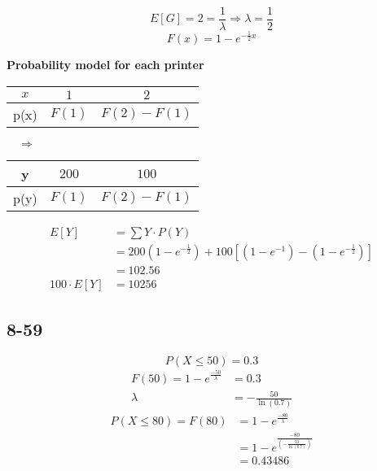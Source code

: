 \documentclass{article}
\begin{document}
			\[
				E[G] = 2 = \frac{1}{\lambda} \Rightarrow \lambda = \frac{1}{2}
			\]
			\[
				F(x) = 1 - e^{-\frac{1}{2} x}
			\]
			\begin{center}
				\textbf{Probability model for each printer} \\
				\vspace{5mm}
				\begin{tabular}{c|c|c}
					$x$ & $1$ & $2$ \\
					\hline
					p(x) & $F(1)$ & $F(2)-F(1)$ \\
				\end{tabular}
				$\quad \Rightarrow \quad$
				\begin{tabular}{c|c|c}
					y & $200$ & $100$ \\
					\hline
					p(y) & $F(1)$ & $F(2)-F(1)$ \\
				\end{tabular}
			\end{center}
			\par
			\begin{equation*}
				\begin{split}
					E[Y] &= \sum Y \cdot P(Y) \\
					&= 200 \left( 1 - e^{-\frac{1}{2}} \right) + 100 \left[ \left( 1 - e^{-1} \right) - \left( 1 - e^{-\frac{1}{2}} \right)\right] \\
					&= 102.56 \\
					100 \cdot E[Y] &= \boxed{\num{10256}}
				\end{split}
			\end{equation*}

	\clearpage

		\subsection*{8-59}

			\[
				P(X \leq 50) = 0.3
			\]
			\begin{equation*}
				\begin{split}
					F(50) = 1 - e^{\frac{-50}{\lambda}} &= 0.3 \\
					\lambda &= -\frac{50}{\ln(0.7)}
				\end{split}
			\end{equation*}
			\begin{equation*}
				\begin{split}
					P(X \leq 80) = F(80) &= 1 - e^{\frac{-80}{\lambda}} \\
					&= 1 - e^{\frac{-80}{\left(-\frac{50}{\ln(0.7)}\right)}} \\
					&= \boxed{\num{0.43486}}
				\end{split}
			\end{equation*}
\end{document}
